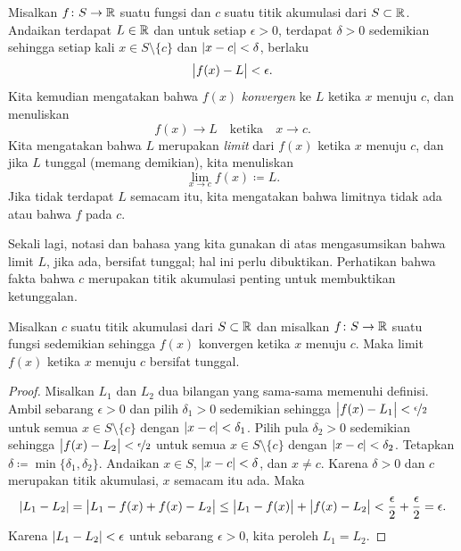 \begin{defn}
%
Misalkan $f \colon S \to {\mathbb{R}}$ suatu fungsi dan $c$ suatu titik akumulasi dari
$S \subset {\mathbb{R}}$.
Andaikan terdapat $L \in {\mathbb{R}}$ dan untuk setiap $\epsilon > 0$,
terdapat $\delta > 0$ sedemikian sehingga setiap kali $x \in S \setminus \{ c \}$
dan $\lvert {x - c} \rvert < \delta$, berlaku
\begin{equation*}
\bigl\lvert {f(x) - L} \bigr\rvert < \epsilon .
\end{equation*}
Kita kemudian mengatakan bahwa $f(x)$ \emph{konvergen} ke $L$ ketika $x$
menuju $c$, dan menuliskan
%
\begin{equation*}
f(x) \to L \quad\text{ketika}\quad x \to c .
\end{equation*}
Kita mengatakan bahwa $L$ merupakan \emph{limit} dari $f(x)$ ketika $x$
menuju $c$, dan jika $L$ tunggal (memang demikian), kita menuliskan
%
\begin{equation*}
\lim_{x \to c} f(x) \coloneqq L .
\end{equation*}
Jika tidak terdapat $L$ semacam itu, kita mengatakan bahwa limitnya tidak ada atau
bahwa $f$ \emph{} pada $c$.
\end{defn}

Sekali lagi, notasi dan bahasa yang kita gunakan di atas mengasumsikan bahwa limit $L$, jika
ada, bersifat tunggal; hal ini perlu dibuktikan.  Perhatikan bahwa fakta bahwa $c$
merupakan titik akumulasi penting untuk membuktikan ketunggalan.

\begin{prop}
Misalkan $c$ suatu titik akumulasi dari $S \subset {\mathbb{R}}$ dan misalkan $f \colon S \to {\mathbb{R}}$
suatu fungsi sedemikian sehingga $f(x)$ konvergen ketika $x$ menuju $c$.  Maka
limit $f(x)$ ketika $x$ menuju $c$ bersifat tunggal.
\end{prop}

\begin{proof}
Misalkan $L_1$ dan $L_2$ dua bilangan yang sama-sama memenuhi definisi.
Ambil sebarang $\epsilon > 0$ dan pilih $\delta_1 > 0$ sedemikian sehingga
$\bigl\lvert {f(x)-L_1} \bigr\rvert < \nicefrac{\epsilon}{2}$ 
untuk semua $x \in S \setminus \{c\}$ dengan $\lvert {x-c} \rvert < \delta_1$.
Pilih pula $\delta_2 > 0$ sedemikian sehingga
$\bigl\lvert {f(x)-L_2} \bigr\rvert < \nicefrac{\epsilon}{2}$
untuk semua $x \in S \setminus \{c\}$ dengan $\lvert {x-c} \rvert < \delta_2$.
Tetapkan $\delta \coloneqq \min \{ \delta_1, \delta_2 \}$.  Andaikan $x \in S$,
$\lvert {x-c} \rvert < \delta$, dan $x \neq c$.  Karena $\delta > 0$ dan $c$ merupakan titik
akumulasi, $x$ semacam itu ada.  Maka
\begin{equation*}
\lvert {L_1 - L_2} \rvert =
\bigl\lvert {L_1 - f(x) + f(x) - L_2} \bigr\rvert \leq
\bigl\lvert {L_1 - f(x)} \bigr\rvert + \bigl\lvert {f(x) - L_2} \bigr\rvert < \frac{\epsilon}{2} + \frac{\epsilon}{2}
= \epsilon.
\end{equation*}
Karena $\lvert {L_1-L_2} \rvert < \epsilon$ untuk sebarang $\epsilon > 0$, kita peroleh
$L_1 = L_2$.
\end{proof}

